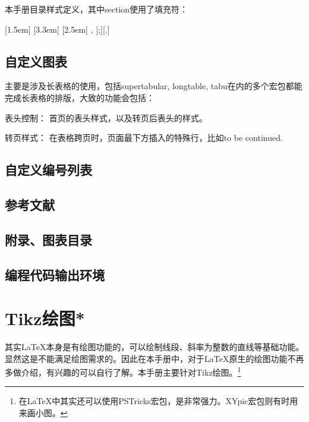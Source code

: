 本手册目录样式定义，其中section使用了填充符：
\begin{latex}{}
[1.5em]{}{\contentslabel{1.5em}}
    {\hspace*{-2em}}{\hfill\contentspage}
[3.3em]{}
    {\contentslabel{1.8em}}{\hspace*{-2.3em}}
    {\titlerule*[8pt]{$\cdot$}\contentspage}
[2.5em]{\small}
    {\thecontentslabel{}}{}
    {, \thecontentspage}[;\qquad][.]
\end{latex}

\section{自定义图表}
\label{sec:figtab}
主要是涉及长表格的使用，包括supertabular, longtable, tabu在内的多个宏包都能完成长表格的排版，大致的功能会包括：
\begin{para}
\item[表头控制：] 首页的表头样式，以及转页后表头的样式。
\item[转页样式：] 在表格跨页时，页面最下方插入的特殊行，比如to be continued. 
\end{para}

\section{自定义编号列表}
\label{sec:list}
\section{\bibtex 参考文献}
\label{sec:bibtex}
\section{附录、图表目录}
\label{sec:appendix}
\section{编程代码输出环境}
\label{sec:coding}

\chapter{Tikz绘图*}
其实\LaTeX 本身是有绘图功能的，可以绘制线段、斜率为整数的直线等基础功能。显然这是不能满足绘图需求的。因此在本手册中，对于\LaTeX{}原生的绘图功能不再多做介绍，有兴趣的可以自行了解。本手册主要针对Tikz绘图。\footnote{在\LaTeX 中其实还可以使用PSTricks宏包，是非常强力。XYpic宏包则有时用来画小图。}


